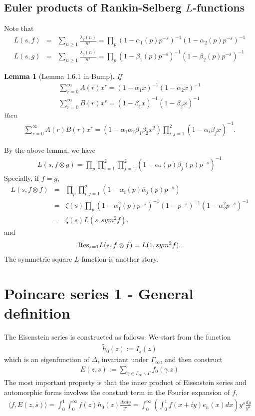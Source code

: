 \documentclass[11pt,reqno]{amsart}
\newcommand{\bna}{\begin{eqnarray*}}
\newcommand{\ena}{\end{eqnarray*}}
\def\res{{\rm Res}}
\newtheorem{lemma}{Lemma}[section]
\theoremstyle{definition}
\begin{document}
\subsection{Euler products of Rankin-Selberg $L$-functions}
Note that
\bna
L(s,f)&=&\sum_{n\geq 1}\frac{\lambda_f(n)}{n^s}=\prod_{p}(1-\alpha_1(p)p^{-s})^{-1}
(1-\alpha_2(p)p^{-s})^{-1}\\
L(s,g)&=&\sum_{n\geq 1}\frac{\lambda_g(n)}{n^s}=\prod_{p}(1-\beta_1(p)p^{-s})^{-1}
(1-\beta_2(p)p^{-s})^{-1}
\ena
\begin{lemma}[Lemma 1.6.1 in Bump]
If
\bna
\sum_{r=0}^\infty A(r)x^r=(1-\alpha_1x)^{-1}(1-\alpha_2x)^{-1}\\
\sum_{r=0}^\infty B(r)x^r=(1-\beta_1x)^{-1}(1-\beta_2x)^{-1}
\ena
then
\bna
\sum_{r=0}^\infty A(r)B(r)x^r=\left(1-\alpha_1\alpha_2\beta_1\beta_2 x^2\right)
\prod_{i,j=1}^2
(1-\alpha_i\beta_j x)^{-1}.
\ena
\end{lemma}

By the above lemma, we have
\bna
L(s,f\otimes g)=\prod_{p}\prod_{i=1}^2\prod_{j=1}^2
\left(1-\alpha_i(p)\beta_j(p)p^{-s}\right)^{-1}
\ena
Specially, if $f=g$,
\bna
L(s,f\otimes f)
&=&\prod_p\prod_{i,j=1}^2\left(1-\alpha_i(p)\overline\alpha_j(p)p^{-s}\right)\\
&=&\zeta(s)\prod_{p}(1-\alpha_1^2(p)p^{-s})^{-1}(1-p^{-s})^{-1}(1-\alpha_2^2p^{-s})^{-1}\\
&=&\zeta(s)L(s,sym^2f).
\ena
and
\bna
\res_{s=1}L(s,f\otimes f)=L(1,sym^2f).
\ena
The symmetric square $L$-function is another story.




\section{Poincare series 1 - General definition}
The Eisenstein series is constructed as follows.
We start from the function
\bna
\tilde h_0(z):=I_s(z)
\ena
which is an eigenfunction of $\Delta$, invariant under $\Gamma_\infty$,
 and then construct
 \bna
 E(z,s):=\sum_{\gamma\in\Gamma_\infty\backslash\Gamma}f_0(\gamma.z)
 \ena
The most important property is that the inner product of Eisenstein series
 and automorphic forms involves the constant term in the Fourier expansion
 of $f$,
 \bna
 \langle f,E(z,\overline s)
 \rangle
 =\int_{0}^1\int_{0}^\infty f(z) h_0(z)\frac{dxdy}{y^2}
 =\int_0^\infty\left( \int_0^1f(x+iy)e_n(x)dx\right)y^s\frac{dy}{y^2}
 \ena
\end{document}
